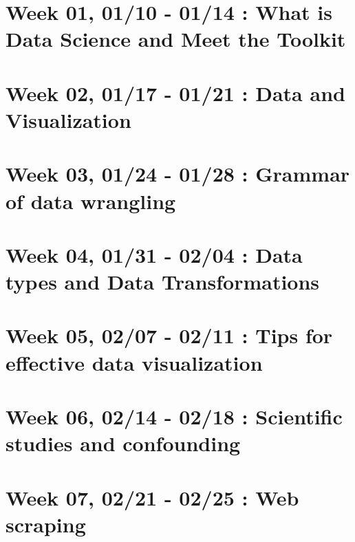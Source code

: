 \hypertarget{week-01-0110---0114-what-is-data-science-and-meet-the-toolkit}{%
\section{Week 01, 01/10 - 01/14 : What is Data Science and Meet the Toolkit}\label{week-01-0110---0114-what-is-data-science-and-meet-the-toolkit}}

\hypertarget{week-02-0117---0121-data-and-visualization}{%
\section{Week 02, 01/17 - 01/21 : Data and Visualization}\label{week-02-0117---0121-data-and-visualization}}

\hypertarget{week-03-0124---0128-grammar-of-data-wrangling}{%
\section{Week 03, 01/24 - 01/28 : Grammar of data wrangling}\label{week-03-0124---0128-grammar-of-data-wrangling}}

\hypertarget{week-04-0131---0204-data-types-and-data-transformations}{%
\section{Week 04, 01/31 - 02/04 : Data types and Data Transformations}\label{week-04-0131---0204-data-types-and-data-transformations}}

\hypertarget{week-05-0207---0211-tips-for-effective-data-visualization}{%
\section{Week 05, 02/07 - 02/11 : Tips for effective data visualization}\label{week-05-0207---0211-tips-for-effective-data-visualization}}

\hypertarget{week-06-0214---0218-scientific-studies-and-confounding}{%
\section{Week 06, 02/14 - 02/18 : Scientific studies and confounding}\label{week-06-0214---0218-scientific-studies-and-confounding}}

\hypertarget{week-07-0221---0225-web-scraping}{%
\section{Week 07, 02/21 - 02/25 : Web scraping}\label{week-07-0221---0225-web-scraping}}

